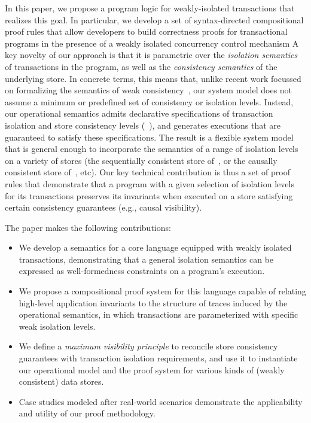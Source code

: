
In this paper, we propose a program logic for weakly-isolated
transactions that realizes this goal.  In particular, we develop a set
of syntax-directed compositional proof rules that allow developers to
build correctness proofs for transactional programs in the presence of
a weakly isolated concurrency control mechanism A key novelty of our
approach is that it is parametric over the \emph{isolation semantics}
of transactions in the program, as well as the \emph{consistency
  semantics} of the underlying store. In concrete terms, this means
that, unlike recent work focussed on formalizing the semantics of weak
consistency~\cite{gotsmanpopl16, redblueatc, ecinec}, our system model
does not assume a minimum or predefined set of consistency or
isolation levels. Instead, our operational semantics admits declarative
specifications of transaction isolation and store consistency levels
(\eg~\cite{pldi15,gotsmanconcur15}), and generates executions that are
guaranteed to satisfy these specifications. The result is a flexible
system model that is general enough to incorporate the semantics of a
range of isolation levels on a variety of stores (\eg the sequentially
consistent store of~\cite{adyaphd}, or the causally consistent store
of~\cite{gotsmanpopl16}, etc).  Our key technical contribution is thus
a set of proof rules that demonstrate that a program with a given
selection of isolation levels for its transactions preserves its 
invariants when executed on a store satisfying certain consistency
guarantees (e.g., causal visibility).

The paper makes the following contributions:
\begin{itemize}
  \item We develop a semantics for a core language equipped with
    weakly isolated transactions, demonstrating that a general
    isolation semantics can be expressed as well-formedness constraints
    on a program's execution.
  \item We propose a compositional proof system for this language
    capable of relating high-level application invariants to the structure
    of traces induced by the operational semantics, in which transactions
    are parameterized with specific weak isolation levels.
  \item We define a \emph{maximum visibility principle} to reconcile
    store consistency guarantees with transaction isolation
    requirements, and use it to instantiate our operational model and
    the proof system for various kinds of (weakly consistent) data
    stores.
  \item Case studies modeled after real-world scenarios demonstrate
    the applicability and utility of our proof methodology.
\end{itemize}

